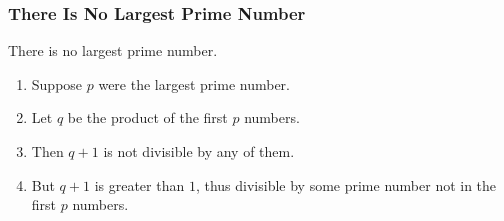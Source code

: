 \documentclass[aspectratio=43,10pt,handout]{beamer}
\begin{document}
\begin{frame} 
\frametitle{There Is No Largest Prime Number} 
\begin{theorem}
There is no largest prime number. 
\end{theorem} 
\begin{enumerate} 
\item Suppose $p$ were the largest prime number. 
\item Let $q$ be the product of the first $p$ numbers. 
\item Then $q+1$ is not divisible by any of them. 
\item But $q + 1$ is greater than $1$, thus divisible by some prime
number not in the first $p$ numbers.
\end{enumerate}
\end{frame}

\begin{frame}[t]
\end{frame}
\end{document}
